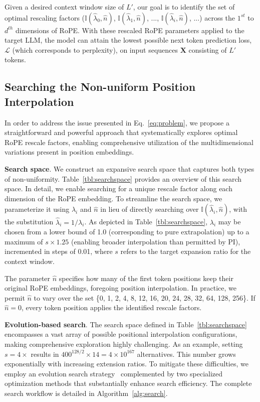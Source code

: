 Given a desired context window size of $L'$, our goal is to identify the set of optimal rescaling factors ($\mathbb{I}(\hat{\lambda}_{0},\hat{n})$, $\mathbb{I}(\hat{\lambda}_{1},\hat{n})$, ..., $\mathbb{I}(\hat{\lambda}_{i},\hat{n})$, ...) across the $1^{st}$ to $d^{th}$ dimensions of RoPE. With these rescaled RoPE parameters applied to the target $\text{LLM}$, the model can attain the lowest possible next token prediction loss, $\mathcal{L}$ (which corresponds to perplexity), on input sequences $\mathbf{X}$ consisting of $L'$ tokens.

\subsection{Searching the Non-uniform Position Interpolation}

In order to address the issue presented in Eq.~\ref{eq:problem}, we propose a straightforward and powerful approach that systematically explores optimal RoPE rescale factors, enabling comprehensive utilization of the multidimensional variations present in position embeddings.

\textbf{Search space}. We construct an expansive search space that captures both types of non-uniformity. Table~\ref{tbl:searchspace} provides an overview of this search space. In detail, we enable searching for a unique rescale factor along each dimension of the RoPE embedding. To streamline the search space, we parameterize it using $\lambda_i$ and $\hat{n}$ in lieu of directly searching over $\mathbb{I}(\hat{\lambda}_{i},\hat{n})$, with the substitution $\hat{\lambda}_{i}=1/\lambda_i$. As depicted in Table~\ref{tbl:searchspace}, $\lambda_i$ may be chosen from a lower bound of 1.0 (corresponding to pure extrapolation) up to a maximum of $s\times1.25$ (enabling broader interpolation than permitted by PI), incremented in steps of 0.01, where $s$ refers to the target expansion ratio for the context window.

The parameter $\hat{n}$ specifies how many of the first token positions keep their original RoPE embeddings, foregoing position interpolation. In practice, we permit $\hat{n}$ to vary over the set \{0, 1, 2, 4, 8, 12, 16, 20, 24, 28, 32, 64, 128, 256\}. If $\hat{n}=0$, every token position applies the identified rescale factors.

\textbf{Evolution-based search}. The search space defined in Table~\ref{tbl:searchspace} encompasses a vast array of possible positional interpolation configurations, making comprehensive exploration highly challenging. As an example, setting $s=4\times$ results in $400^{128/2}\times14=4\times10^{167}$ alternatives. This number grows exponentially with increasing extension ratios. To mitigate these difficulties, we employ an evolution search strategy~\cite{guo2020single} complemented by two specialized optimization methods that substantially enhance search efficiency. The complete search workflow is detailed in Algorithm~\ref{alg:search}.

